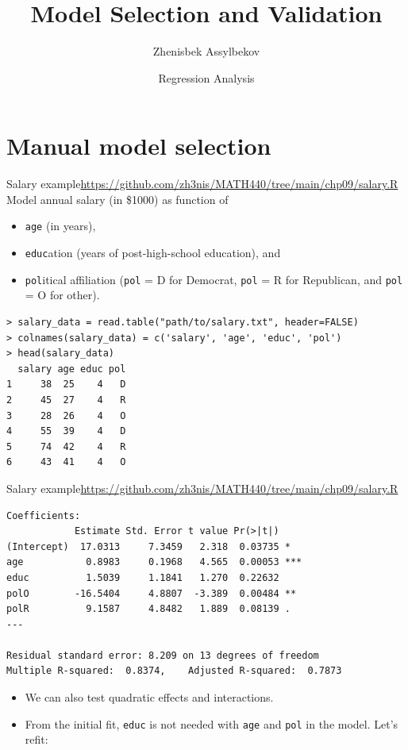 \documentclass{beamer}
\title{Model Selection and Validation}
\author{Zhenisbek Assylbekov}
\institute{Department of Mathematics}
\date{Regression Analysis}
\begin{document}
\begin{frame}
  \titlepage
\end{frame}

\section{Manual model selection}

\begin{frame}[fragile]{Salary example}{\url{https://github.com/zh3nis/MATH440/tree/main/chp09/salary.R}}
Model annual salary (in \$1000) as function of \begin{itemize}
    \item\pause \texttt{age} (in years),
    \item\pause \texttt{educ}ation (years of post-high-school education), and 
    \item\pause \texttt{pol}itical affiliation (\texttt{pol} = D for
Democrat, \texttt{pol} = R for Republican, and \texttt{pol} = O for other).
\end{itemize}  

\begin{footnotesize}
\pause\begin{verbatim}
> salary_data = read.table("path/to/salary.txt", header=FALSE)
> colnames(salary_data) = c('salary', 'age', 'educ', 'pol')
> head(salary_data)
  salary age educ pol
1     38  25    4   D
2     45  27    4   R
3     28  26    4   O
4     55  39    4   D
5     74  42    4   R
6     43  41    4   O
\end{verbatim}
\end{footnotesize}
\end{frame}

\begin{frame}[fragile]{Salary example}{\url{https://github.com/zh3nis/MATH440/tree/main/chp09/salary.R}}
\begin{footnotesize}
\begin{verbatim}
Coefficients:
            Estimate Std. Error t value Pr(>|t|)    
(Intercept)  17.0313     7.3459   2.318  0.03735 *  
age           0.8983     0.1968   4.565  0.00053 ***
educ          1.5039     1.1841   1.270  0.22632    
polO        -16.5404     4.8807  -3.389  0.00484 ** 
polR          9.1587     4.8482   1.889  0.08139 .  
---

Residual standard error: 8.209 on 13 degrees of freedom
Multiple R-squared:  0.8374,	Adjusted R-squared:  0.7873     
\end{verbatim}
\end{footnotesize}

\begin{itemize}
\item We can also test quadratic effects and interactions.
\item From the initial fit, \texttt{educ} is not needed with \texttt{age} and \texttt{pol} in
the model. Let's refit:
\end{itemize}

\end{frame}
\end{document}
